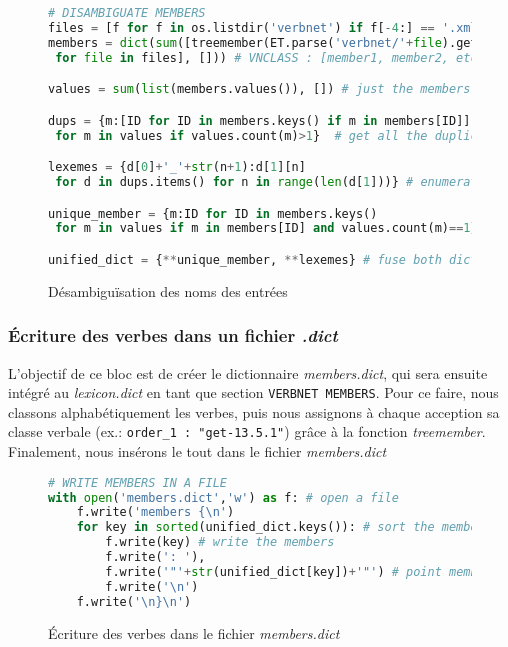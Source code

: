 \begin{figure}[htb]
  \caption{Désambiguïsation des noms des entrées}
	\label{fig:scriptmember-bloc2}
\begin{lstlisting}[language=Python]
# DISAMBIGUATE MEMBERS
files = [f for f in os.listdir('verbnet') if f[-4:] == '.xml']
members = dict(sum([treemember(ET.parse('verbnet/'+file).getroot())
 for file in files], [])) # VNCLASS : [member1, member2, etc. ]

values = sum(list(members.values()), []) # just the members of all classes

dups = {m:[ID for ID in members.keys() if m in members[ID]]
 for m in values if values.count(m)>1}  # get all the duplicates

lexemes = {d[0]+'_'+str(n+1):d[1][n]
 for d in dups.items() for n in range(len(d[1]))} # enumerate all duplicates: eat_1, eat_2

unique_member = {m:ID for ID in members.keys() 
 for m in values if m in members[ID] and values.count(m)==1} #  get all unique lexemes

unified_dict = {**unique_member, **lexemes} # fuse both dict. to get all members disambiguated
\end{lstlisting}
\end{figure}

\subsubsection{Écriture des verbes dans un fichier \emph{.dict}}

L'objectif de ce bloc est de créer le dictionnaire \emph{members.dict}, qui sera ensuite intégré au \emph{lexicon.dict} en tant que section \texttt{VERBNET MEMBERS}. Pour ce faire, nous classons alphabétiquement les verbes, puis nous assignons à chaque acception sa classe verbale (ex.: \lstinline|order_1 : "get-13.5.1"|) grâce à la fonction \emph{treemember}. Finalement, nous insérons le tout dans le fichier \emph{members.dict}

\begin{figure}[htb]
  \caption{Écriture des verbes dans le fichier \emph{members.dict}}
	\label{fig:scriptmember-bloc3}
\begin{lstlisting}[language=Python]
# WRITE MEMBERS IN A FILE
with open('members.dict','w') as f: # open a file
    f.write('members {\n')
    for key in sorted(unified_dict.keys()): # sort the members
        f.write(key) # write the members
        f.write(': '),
        f.write('"'+str(unified_dict[key])+'"') # point members towards ID of VNCLASS
        f.write('\n')
    f.write('\n}\n')
\end{lstlisting}
\end{figure}

